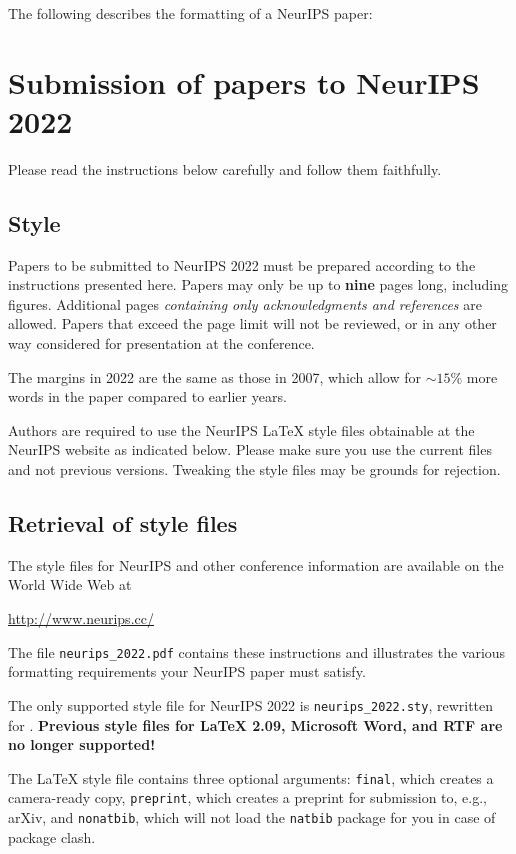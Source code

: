 \documentclass{article}
\begin{document}
\newpage
\color{red}
The following describes the formatting of a NeurIPS paper:
\section{Submission of papers to NeurIPS 2022}


Please read the instructions below carefully and follow them faithfully.


\subsection{Style}


Papers to be submitted to NeurIPS 2022 must be prepared according to the
instructions presented here. Papers may only be up to {\bf nine} pages long,
including figures. Additional pages \emph{containing only acknowledgments and
references} are allowed. Papers that exceed the page limit will not be
reviewed, or in any other way considered for presentation at the conference.


The margins in 2022 are the same as those in 2007, which allow for $\sim$$15\%$
more words in the paper compared to earlier years.


Authors are required to use the NeurIPS \LaTeX{} style files obtainable at the
NeurIPS website as indicated below. Please make sure you use the current files
and not previous versions. Tweaking the style files may be grounds for
rejection.


\subsection{Retrieval of style files}


The style files for NeurIPS and other conference information are available on
the World Wide Web at
\begin{center}
  \url{http://www.neurips.cc/}
\end{center}
The file \verb+neurips_2022.pdf+ contains these instructions and illustrates the
various formatting requirements your NeurIPS paper must satisfy.


The only supported style file for NeurIPS 2022 is \verb+neurips_2022.sty+,
rewritten for \LaTeXe{}.  \textbf{Previous style files for \LaTeX{} 2.09,
  Microsoft Word, and RTF are no longer supported!}


The \LaTeX{} style file contains three optional arguments: \verb+final+, which
creates a camera-ready copy, \verb+preprint+, which creates a preprint for
submission to, e.g., arXiv, and \verb+nonatbib+, which will not load the
\verb+natbib+ package for you in case of package clash.
\end{document}
